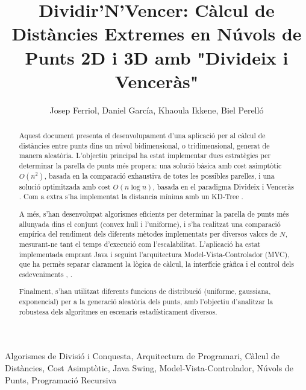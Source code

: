 \documentclass{ieeetj}
\begin{document}

\title{Dividir'N'Vencer: Càlcul de Distàncies Extremes en Núvols de Punts 2D i 3D amb "Divideix i Venceràs"}

\author{Josep Ferriol, Daniel García, Khaoula Ikkene, Biel Perelló}  

\begin{abstract} 
Aquest document presenta el desenvolupament d’una aplicació per al càlcul de distàncies entre punts dins un núvol bidimensional, o tridimensional, generat de manera aleatòria. L’objectiu principal ha estat implementar dues estratègies per determinar la parella de punts més propera: una solució bàsica amb cost asimptòtic \( O(n^2) \), basada en la comparació exhaustiva de totes les possibles parelles, i una solució optimitzada amb cost \( O(n \log n) \), basada en el paradigma Divideix i Venceràs \cite{DivideAndConquer}. Com a extra s'ha implementat la distancia mínima amb un KD-Tree \cite{kdTree}. 

A més, s’han desenvolupat algorismes eficients per determinar la parella de punts més allunyada dins el conjunt (convex hull i l'uniforme), i s’ha realitzat una comparació empírica del rendiment dels diferents mètodes implementats per diversos valors de \( N \), mesurant-ne tant el temps d’execució com l’escalabilitat. L’aplicació ha estat implementada emprant Java i seguint l’arquitectura Model-Vista-Controlador (MVC), que ha permès separar clarament la lògica de càlcul, la interfície gràfica i el control dels esdeveniments \cite{SwingLibrary}, \cite{MVCPattern} \cite{JavaFX}.

Finalment, s’han utilitzat diferents funcions de distribució (uniforme, gaussiana, exponencial) per a la generació aleatòria dels punts, amb l’objectiu d’analitzar la robustesa dels algoritmes en escenaris estadísticament diversos.
\end{abstract}

\begin{IEEEkeywords} 
Algorismes de Divisió i Conquesta, Arquitectura de Programari, Càlcul de Distàncies, Cost Asimptòtic, Java Swing, Model-Vista-Controlador, Núvols de Punts, Programació Recursiva
\end{IEEEkeywords}


\maketitle
\end{document}
